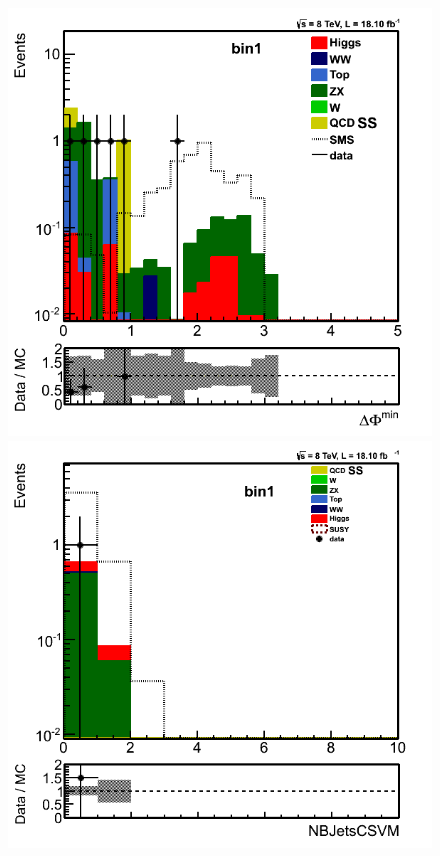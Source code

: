 \begin{figure}[!Hhtb]
\includegraphics[angle=0,scale=0.35]{TauTauFigs/mindphi_bin1_14nov.png}
\includegraphics[angle=0,scale=0.35]{TauTauFigs/NB_bin1_15nov.png}

\end{figure}
